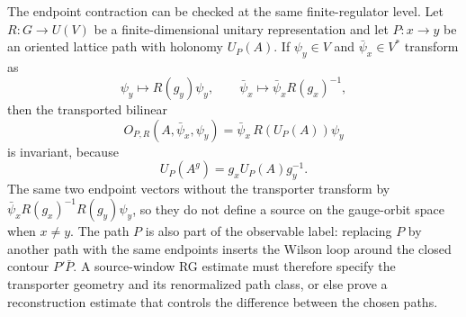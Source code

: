The endpoint contraction can be checked at the same finite-regulator level.
Let \(R:G\to U(V)\) be a finite-dimensional unitary representation and let
\(P:x\to y\) be an oriented lattice path with holonomy \(U_P(A)\).  If
\(\psi_y\in V\) and \(\bar\psi_x\in V^\ast\) transform as
\[
  \psi_y\mapsto R(g_y)\psi_y,
  \qquad
  \bar\psi_x\mapsto \bar\psi_x R(g_x)^{-1},
\]
then the transported bilinear
\begin{equation}
  O_{P,R}(A,\bar\psi_x,\psi_y)
  =
  \bar\psi_x\,R\!\left(U_P(A)\right)\psi_y
  \label{eq:gauge-transported-bilinear-source}
\end{equation}
is invariant, because
\[
  U_P(A^g)=g_xU_P(A)g_y^{-1}.
\]
The same two endpoint vectors without the transporter transform by
\(\bar\psi_xR(g_x)^{-1}R(g_y)\psi_y\), so they do not define a source on the
gauge-orbit space when \(x\neq y\).  The path \(P\) is also part of the
observable label: replacing \(P\) by another path with the same endpoints
inserts the Wilson loop around the closed contour \(P'\bar P\).  A
source-window RG estimate must therefore specify the transporter geometry
and its renormalized path class, or else prove a reconstruction estimate that
controls the difference between the chosen paths.


